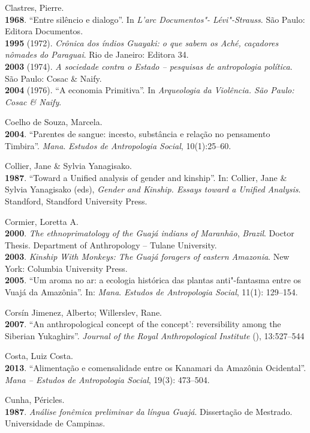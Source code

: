 \begin{Parskip}
Clastres, Pierre.\\
\textbf{1968}. ``Entre silêncio e dialogo''. In \emph{L'arc Documentos"-
Lévi"-Strauss}. São Paulo: Editora Documentos.\\
\textbf{1995} (1972). \emph{Crônica dos índios Guayaki: o que sabem os
Aché, caçadores nômades do Paraguai}. Rio de Janeiro: Editora 34.\\
\textbf{2003} (1974). \emph{A sociedade contra o Estado -- pesquisas de
antropologia política}. São Paulo: Cosac \& Naify.\\
\textbf{2004} (1976). ``A economia Primitiva''. In \emph{Arqueologia da
Violência. São Paulo: Cosac \& Naify}.

Coelho de Souza, Marcela.\\
\textbf{2004}. ``Parentes de sangue: incesto, substância e relação no
pensamento Timbira''. \emph{Mana}. \emph{Estudos de Antropologia
Social}, 10(1):25--60.

Collier, Jane \& Sylvia Yanagisako.\\
\textbf{1987}. ``Toward a Unified analysis of gender and kinship''. In:
Collier, Jane \& Sylvia Yanagisako (eds), \emph{Gender and Kinship.
Essays toward a Unified Analysis}. Standford, Standford University
Press.

Cormier, Loretta A.\\
\textbf{2000}. \emph{The ethnoprimatology of the Guajá indians of
Maranhão}, \emph{Brazil}. Doctor Thesis. Department of Anthropology --
Tulane University.\\
\textbf{2003}. \emph{Kinship With Monkeys: The Guajá foragers of eastern
Amazonia}. New York: Columbia University Press.\\
\textbf{2005}. ``Um aroma no ar: a ecologia histórica das plantas
anti"-fantasma entre os Vuajá da Amazônia''. In: \emph{Mana}.
\emph{Estudos de Antropologia Social}, 11(1): 129--154.

Corsín Jimenez, Alberto; Willerslev, Rane.\\
\textbf{2007}. ``An anthropological concept of the concept':
reversibility among the Siberian Yukaghirs''. \emph{Journal of the Royal
Anthropological Institute} (), 13:527--544

Costa, Luiz Costa.\\
\textbf{2013}. ``Alimentação e comensalidade entre os Kanamari da
Amazônia Ocidental''. \emph{Mana -- Estudos de Antropologia Social},
19(3): 473--504.

Cunha, Péricles.\\
\textbf{1987}. \emph{Análise fonêmica preliminar da língua Guajá}.
Dissertação de Mestrado. Universidade de Campinas.


\end{Parskip}
